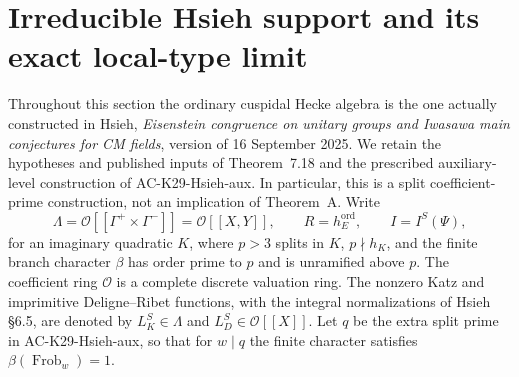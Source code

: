 \section{Irreducible Hsieh support and its exact local-type limit}
\label{sec:cubic-hsieh-stable-component}

Throughout this section the ordinary cuspidal Hecke algebra is the
one actually constructed in Hsieh, \emph{Eisenstein congruence on
unitary groups and Iwasawa main conjectures for CM fields},
version of 16 September 2025.  We retain the hypotheses and published
inputs of Theorem~7.18 and the prescribed auxiliary-level construction
of AC-K29-Hsieh-aux.  In particular, this is a split coefficient-prime
construction, not an implication of Theorem~A.  Write
\[
 \Lambda=\mathcal O[[\Gamma^+\times\Gamma^-]]
          =\mathcal O[[X,Y]],\qquad R=h_E^{\mathrm{ord}},
 \qquad I=I^S(\Psi),                                      \tag{G64.1}
\]
for an imaginary quadratic $K$, where $p>3$ splits in $K$,
$p\nmid h_K$, and the finite branch character $\beta$ has order
prime to $p$ and is unramified above $p$.
The coefficient ring $\mathcal O$ is a complete discrete valuation
ring.  The nonzero Katz and imprimitive Deligne--Ribet functions,
with the integral normalizations of Hsieh \S6.5, are denoted by
$L_K^S\in\Lambda$ and $L_D^S\in\mathcal O[[X]]$.
Let $q$ be the extra split prime in AC-K29-Hsieh-aux, so that for
$w\mid q$ the finite character satisfies
$\beta(\operatorname{Frob}_w)=1$.


